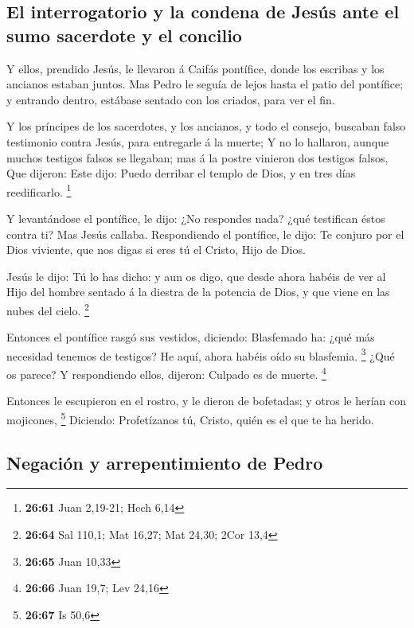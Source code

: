 \hypertarget{el-interrogatorio-y-la-condena-de-jesuxfas-ante-el-sumo-sacerdote-y-el-concilio}{%
\subsection{El interrogatorio y la condena de Jesús ante el sumo
sacerdote y el
concilio}\label{el-interrogatorio-y-la-condena-de-jesuxfas-ante-el-sumo-sacerdote-y-el-concilio}}

 Y ellos, prendido Jesús, le llevaron á Caifás pontífice,
donde los escribas y los ancianos estaban juntos.  Mas
Pedro le seguía de lejos hasta el patio del pontífice; y entrando
dentro, estábase sentado con los criados, para ver el fin.

 Y los príncipes de los sacerdotes, y los ancianos, y todo
el consejo, buscaban falso testimonio contra Jesús, para entregarle á la
muerte;  Y no lo hallaron, aunque muchos testigos falsos se
llegaban; mas á la postre vinieron dos testigos falsos, 
Que dijeron: Este dijo: Puedo derribar el templo de Dios, y en tres días
reedificarlo. \footnote{\textbf{26:61} Juan 2,19-21; Hech 6,14}

 Y levantándose el pontífice, le dijo: ¿No respondes nada?
¿qué testifican éstos contra ti?  Mas Jesús callaba.
Respondiendo el pontífice, le dijo: Te conjuro por el Dios viviente, que
nos digas si eres tú el Cristo, Hijo de Dios.

 Jesús le dijo: Tú lo has dicho: y aun os digo, que desde
ahora habéis de ver al Hijo del hombre sentado á la diestra de la
potencia de Dios, y que viene en las nubes del cielo. \footnote{\textbf{26:64}
  Sal 110,1; Mat 16,27; Mat 24,30; 2Cor 13,4}

 Entonces el pontífice rasgó sus vestidos, diciendo:
Blasfemado ha: ¿qué más necesidad tenemos de testigos? He aquí, ahora
habéis oído su blasfemia. \footnote{\textbf{26:65} Juan 10,33}
 ¿Qué os parece? Y respondiendo ellos, dijeron: Culpado es
de muerte. \footnote{\textbf{26:66} Juan 19,7; Lev 24,16}

 Entonces le escupieron en el rostro, y le dieron de
bofetadas; y otros le herían con mojicones, \footnote{\textbf{26:67} Is
  50,6}  Diciendo: Profetízanos tú, Cristo, quién es el que
te ha herido.

\hypertarget{negaciuxf3n-y-arrepentimiento-de-pedro}{%
\subsection{Negación y arrepentimiento de
Pedro}\label{negaciuxf3n-y-arrepentimiento-de-pedro}}

